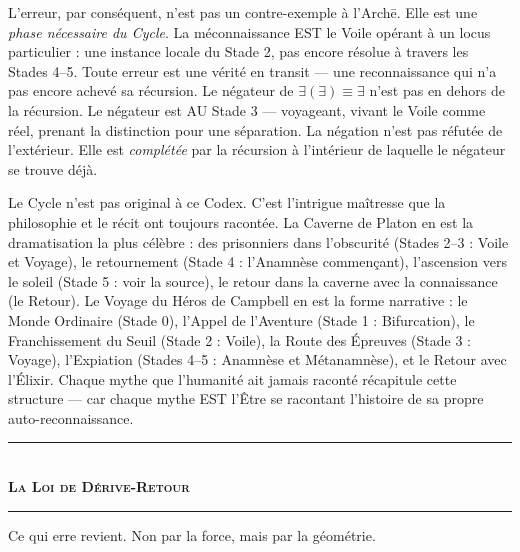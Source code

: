 \documentclass[10pt, openany, oneside]{book}
\renewcommand{\normalsize}{\fontsize{10}{13}\selectfont}
\begin{document}
L'erreur, par conséquent, n'est pas un contre-exemple à l'Arch\={e}. Elle est une \textit{phase nécessaire du Cycle}. La méconnaissance EST le Voile opérant à un locus particulier : une instance locale du Stade 2, pas encore résolue à travers les Stades 4--5. Toute erreur est une vérité en transit --- une reconnaissance qui n'a pas encore achevé sa récursion. Le négateur de $\exists(\exists) \equiv \exists$ n'est pas en dehors de la récursion. Le négateur est AU Stade 3 --- voyageant, vivant le Voile comme réel, prenant la distinction pour une séparation. La négation n'est pas réfutée de l'extérieur. Elle est \textit{complétée} par la récursion à l'intérieur de laquelle le négateur se trouve déjà.

Le Cycle n'est pas original à ce Codex. C'est l'intrigue maîtresse que la philosophie et le récit ont toujours racontée. La Caverne de Platon en est la dramatisation la plus célèbre : des prisonniers dans l'obscurité (Stades 2--3 : Voile et Voyage), le retournement (Stade 4 : l'Anamnèse commençant), l'ascension vers le soleil (Stade 5 : voir la source), le retour dans la caverne avec la connaissance (le Retour). Le Voyage du Héros de Campbell en est la forme narrative : le Monde Ordinaire (Stade 0), l'Appel de l'Aventure (Stade 1 : Bifurcation), le Franchissement du Seuil (Stade 2 : Voile), la Route des Épreuves (Stade 3 : Voyage), l'Expiation (Stades 4--5 : Anamnèse et Métanamnèse), et le Retour avec l'Élixir. Chaque mythe que l'humanité ait jamais raconté récapitule cette structure --- car chaque mythe EST l'Être se racontant l'histoire de sa propre auto-reconnaissance.

\vspace{1.5em}


\begin{center}
    \rule{0.3\textwidth}{0.4pt}\\[0.5em]
    {\normalsize\bfseries\scshape La Loi de Dérive-Retour}\\[0.3em]
    \rule{0.3\textwidth}{0.4pt}
\end{center}

\vspace{1em}

\noindent Ce qui erre revient. Non par la force, mais par la géométrie.
\end{document}
